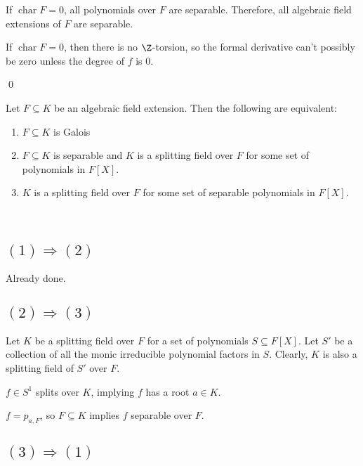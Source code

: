 \documentclass[x11names,reqno,14pt]{extarticle}
\DeclareMathOperator{\Char}{char}
\begin{document}
\cor

If $\Char F = 0$, all polynomials over $F$ are separable. Therefore, all algebraic field extensions of $F$ are separable. 

\proof

If $\Char F = 0$, then there is no $\Z$-torsion, so the formal derivative can't possibly be zero unless the degree of $f$ is 0. 

\qed

\thm 

Let $F \subseteq K$ be an algebraic field extension. Then the following are equivalent:

\begin{enumerate}

\item $F \subseteq K$ is Galois

\item $F \subseteq K$ is separable and $K$ is a splitting field over $F$ for some set of polynomials in $F[X]$. 

\item $K$ is a splitting field over $F$ for some set of separable polynomials in $F[X]$. 

\end{enumerate}

\proof\,

\subsection*{$(1)\Rightarrow(2)$}

Already done.

\subsection*{$(2)\Rightarrow(3)$}

Let $K$ be a splitting field over $F$ for a set of polynomials $S \subseteq F[X]$. Let $S'$ be a collection of all the monic irreducible polynomial factors in $S$. Clearly, $K$ is also a splitting field of $S'$ over $F$. 

$f \in S^1$ splits over $K$, implying $f$ has a root $a \in K$. 

$f = p_{a, F}$, so $F \subseteq K$ implies $f$ separable over $F$. 

\subsection*{$(3)\Rightarrow(1)$}
\end{document}
